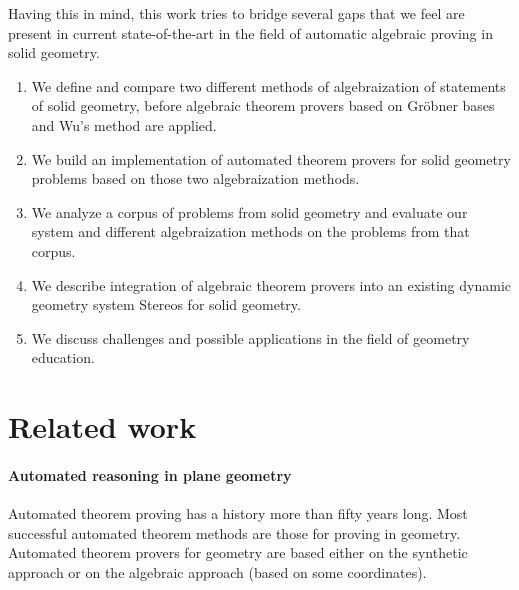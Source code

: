 \documentclass[final,1p,times,authoryear]{elsarticle}
\begin{document}
Having this in mind, this work tries to bridge several gaps that we
feel are present in current state-of-the-art in the field of automatic
algebraic proving in solid geometry.
\begin{enumerate}
\item We define and compare two different methods of algebraization of
  statements of solid geometry, before algebraic theorem provers based
  on Gr\"obner bases and Wu's method are applied.

\item We build an implementation of automated theorem provers for
  solid geometry problems based on those two algebraization methods.

\item We analyze a corpus of problems from solid geometry and evaluate
  our system and different algebraization methods on the problems from
  that corpus.

\item We describe integration of algebraic theorem provers into an
  existing dynamic geometry system Stereos for solid geometry.

\item We discuss challenges and possible applications in the field of
  geometry education.
\end{enumerate}


\section{Related work}
\paragraph{Automated reasoning in plane geometry}
Automated theorem proving has a history more than fifty years
long. Most successful automated theorem methods are those for proving
in geometry. Automated theorem provers for geometry are based either
on the synthetic approach or on the algebraic approach (based on some
coordinates).
\end{document}

